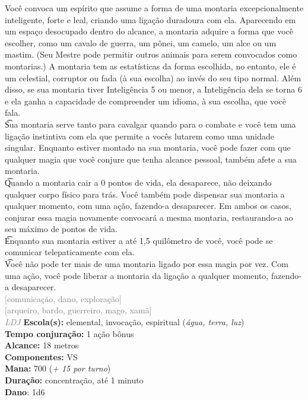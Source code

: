 \documentclass{RPG_Adventure}[2021/10/20]
\begin{document}
{\normalsize Você convoca um espírito que assume a forma de uma montaria excepcionalmente inteligente, forte e leal, criando uma ligação duradoura com ela. Aparecendo em um espaço desocupado dentro do alcance, a montaria adquire a forma que você escolher, como um cavalo de guerra, um pônei, um camelo, um alce ou um mastim.  (Seu Mestre pode permitir outros animais para serem convocados como montarias.) A montaria tem as estatísticas da forma escolhida, no entanto, ele é um celestial, corruptor ou fada (à sua escolha) ao invés do seu tipo normal. Além disso, se sua montaria tiver Inteligência 5 ou menor, a Inteligência dela se torna 6 e ela ganha a capacidade de compreender um idioma, à sua escolha, que você fala.\\\t Sua montaria serve tanto para cavalgar quando para o combate e você tem uma ligação instintiva com ela que permite a vocês lutarem como uma unidade singular.  Enquanto estiver montado na sua montaria, você pode fazer com que qualquer magia que você conjure que tenha alcance pessoal, também afete a sua montaria.\\\t Quando a montaria cair a 0 pontos de vida, ela desaparece, não deixando qualquer corpo físico para trás.  Você também pode dispensar sua montaria a qualquer momento, com uma ação, fazendo-a desaparecer. Em ambos os casos, conjurar essa magia novamente convocará a mesma montaria, restaurando-a ao seu máximo de pontos de vida.\\\t Enquanto sua montaria estiver a até 1,5 quilômetro de você, você pode se comunicar telepaticamente com ela.\\\t Você não pode ter mais de uma montaria ligado por essa magia por vez. Com uma ação, você pode liberar a montaria da ligação a qualquer momento, fazendo-a desaparecer.\\}
{\scriptsize \textcolor{gray}{[comunicação, dano, exploração]\\}}
{\scriptsize \textcolor{gray}{[arqueiro, bardo, guerreiro, mago, xamã]\\}}
{\tiny \textcolor{gray}{\textit{LDJ}}}\jump{}
{\small \t \textbf{Escola(s):} elemental, invocação, espiritual (\textit{água, terra, luz})\\\t \textbf{Tempo conjuração:} 1 ação bônus\\\t \textbf{Alcance:} 18 metros\\\t \textbf{Componentes:} VS\\\t \textbf{Mana:} 700 (\textit{+ 15 por turno})\\\t \textbf{Duração:} concentração, até 1 minuto\\\t \textbf{Dano}: 1d6\\}
\end{document}
